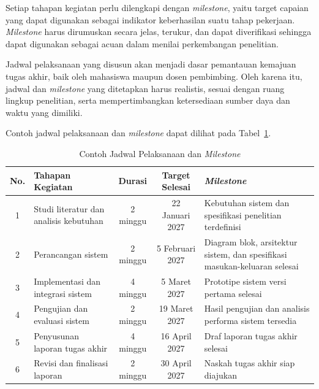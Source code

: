 Setiap tahapan kegiatan perlu dilengkapi dengan \emph{milestone}, yaitu target capaian yang dapat digunakan sebagai indikator keberhasilan suatu tahap pekerjaan. \emph{Milestone} harus dirumuskan secara jelas, terukur, dan dapat diverifikasi sehingga dapat digunakan sebagai acuan dalam menilai perkembangan penelitian.

Jadwal pelaksanaan yang disusun akan menjadi dasar pemantauan kemajuan tugas akhir, baik oleh mahasiswa maupun dosen pembimbing. Oleh karena itu, jadwal dan \emph{milestone} yang ditetapkan harus realistis, sesuai dengan ruang lingkup penelitian, serta mempertimbangkan ketersediaan sumber daya dan waktu yang dimiliki.

Contoh jadwal pelaksanaan dan \emph{milestone} dapat dilihat pada Tabel~\ref{tab:jadwal}.

\begin{table}[!ht]
    \centering
    \caption{Contoh Jadwal Pelaksanaan dan \textit{Milestone}}
    \label{tab:jadwal}
    \begin{tabular}{|c|p{}|c|c|p{}|}
        \hline
        No. & Tahapan Kegiatan & Durasi & Target Selesai & \textit{Milestone} \\
        \hline
        1 & Studi literatur dan analisis kebutuhan & 2 minggu & 22 Januari 2027 & Kebutuhan sistem dan spesifikasi penelitian terdefinisi \\
        \hline
        2 & Perancangan sistem & 2 minggu & 5 Februari 2027 & Diagram blok, arsitektur sistem, dan spesifikasi masukan-keluaran selesai \\
        \hline
        3 & Implementasi dan integrasi sistem & 4 minggu & 5 Maret 2027 & Prototipe sistem versi pertama selesai \\
        \hline
        4 & Pengujian dan evaluasi sistem & 2 minggu & 19 Maret 2027 & Hasil pengujian dan analisis performa sistem tersedia \\
        \hline
        5 & Penyusunan laporan tugas akhir & 4 minggu & 16 April 2027 & Draf laporan tugas akhir selesai \\
        \hline
        6 & Revisi dan finalisasi laporan & 2 minggu & 30 April 2027 & Naskah tugas akhir siap diajukan \\
        \hline
    \end{tabular}
\end{table}

